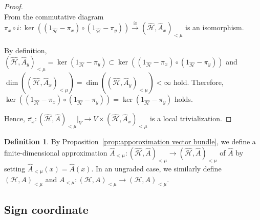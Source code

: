 \documentclass{amsart}
\theoremstyle{definition}
\newtheorem{dfn}[thm]{Definition}
\theoremstyle{remark}
\begin{document}
\begin{proof}
\\


From the commutative diagram $\pi_x\circ i : \ker((1_{\hat{\mathcal{H}}}-\pi_{x})\circ(1_{\hat{\mathcal{H}}}-\pi_{y})) \stackrel{\cong}{\longrightarrow} (\hat{\mathcal{H}}, \hat{A}_x)_{<\mu}$ is an isomorphism.

By definition, \((\hat{\mathcal{H}}, \hat{A}_y)_{<\mu} = \ker(1_{\hat{\mathcal{H}}} - \pi_y) \subset \ker((1_{\hat{\mathcal{H}}} - \pi_x) \circ (1_{\hat{\mathcal{H}}} - \pi_y))\) and \(\dim((\hat{\mathcal{H}}, \hat{A}_x)_{<\mu}) = \dim((\hat{\mathcal{H}}, \hat{A}_y)_{<\mu}) < \infty\) hold. Therefore, \(\ker((1_{\hat{\mathcal{H}}} - \pi_x) \circ (1_{\hat{\mathcal{H}}} - \pi_y)) = \ker(1_{\hat{\mathcal{H}}} - \pi_y)\) holds.
                                                         
Hence, $\overline{\pi_{x}}:(\hat{\mathcal{H}}, \hat{A})_{<\mu}|_{V}\to V\times(\hat{\mathcal{H}}, \hat{A}_x)_{<\mu}$ is a local trivialization.
   \end{proof}

\begin{dfn}
By Proposition~\ref{prop:apporoximation vector bundle}, we define a finite-dimensional approximation
$\hat{A}_{<\mu} : (\hat{\mathcal{H}}, \hat{A})_{<\mu} \to (\hat{\mathcal{H}}, \hat{A})_{<\mu}$
of $\hat{A}$ by setting \(\hat{A}_{<\mu}(x) = \hat{A}(x)\). In an ungraded case, we similarly define \((\mathcal{H}, A)_{<\mu}\) and $A_{<\mu} : (\mathcal{H}, A)_{<\mu} \to (\mathcal{H}, A)_{<\mu}$.
\end{dfn}




\subsection{Sign coordinate}
\label{sub:Sign coorinate}
\end{document}
